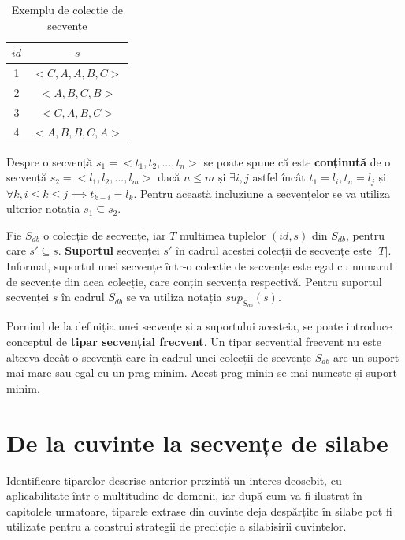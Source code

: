 \begin{table}[h]
\centering    
\begin{tabular}{|c|c|}    
\hline      
$id$ & $s$ \\
\hline                    
1 & $<C,A,A,B,C>$ \\
2 & $<A,B,C,B>$ \\
3 & $<C,A,B,C>$ \\
4 & $<A,B,B,C,A>$ \\
\hline                              
\end{tabular}
\caption{Exemplu de colecție de secvențe}
\label{table:sdb}               
\end{table}

\begin{defi}
Despre o secvență $s_1=<t_1, t_2, ...,t_n>$ se poate spune că este \textbf{conținută} de o secvență $s_2=<l_1, l_2, ...,l_m>$ dacă $n \leq m$ și $ \exists i,j$ astfel încât $t_1 = l_i, t_n = l_j$ și $\forall k, i \leq k \leq j \implies t_{k-i} = l_k$. Pentru această incluziune a secvențelor se va utiliza ulterior notația $s_1 \subseteq s_2$.
\end{defi}
      
\begin{defi}

Fie $S_{db}$ o colecție de secvențe, iar $T$ multimea tuplelor $(id, s)$ din $S_{db}$, pentru care $s' \subseteq s$. \textbf{Suportul} secvenței $s'$ în cadrul acestei colecții de secvențe este $\vert T \vert$.  Informal, suportul unei secvențe într-o colecție de secvențe este egal cu numarul de secvențe din acea colecție, care conțin secvența respectivă. Pentru suportul secvenței $s$ în cadrul $S_{db}$ se va utiliza notația $sup_{S_{db}}(s)$.
\end{defi}

\begin{defi}
Pornind de la definiția unei secvențe și a suportului acesteia, se poate introduce conceptul de \textbf{tipar secvențial frecvent}. Un tipar secvențial frecvent nu este altceva decât o secvență care în cadrul unei colecții de secvențe $S_{db}$ are un suport mai mare sau egal cu un prag minim. Acest prag minin se mai numește și suport minim.
\end{defi}
\section{De la cuvinte la secvențe de silabe}
Identificare tiparelor descrise anterior prezintă un interes deosebit, cu aplicabilitate într-o multitudine de domenii, iar după cum va fi ilustrat în capitolele urmatoare, tiparele extrase din cuvinte deja despărțite în silabe pot fi utilizate pentru a construi strategii de predicție a silabisirii cuvintelor. 

